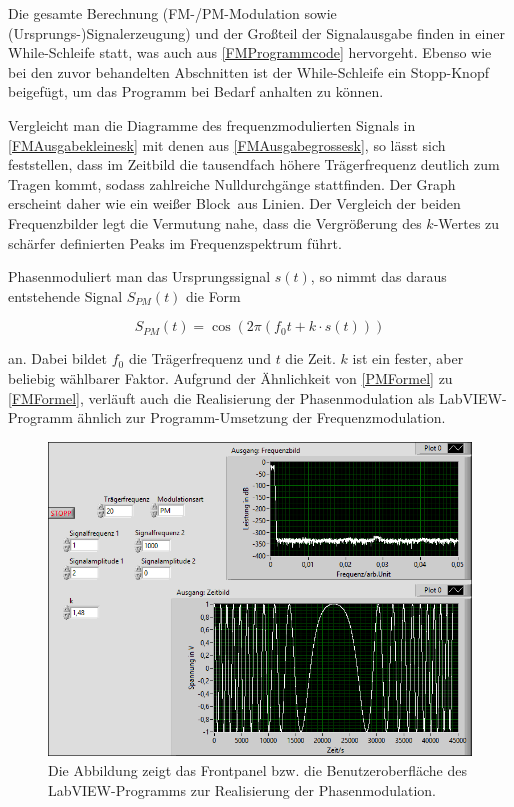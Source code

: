 \documentclass[
a4paper,
12pt,
pagesize,
ngerman
]{scrartcl}
\begin{document}
	\noindent Die gesamte Berechnung (FM-/PM-Modulation sowie (Ursprungs-)Signalerzeugung) und der Großteil der Signalausgabe finden in einer While-Schleife statt, was auch aus \cref{FMProgrammcode} hervorgeht. %
	Ebenso wie bei den zuvor behandelten Abschnitten ist der While-Schleife ein \glqq Stopp\grqq -Knopf beigefügt, um das Programm bei Bedarf anhalten zu können.

	Vergleicht man die Diagramme des frequenzmodulierten Signals in \cref{FMAusgabekleinesk} mit denen aus \cref{FMAusgabegrossesk}, so lässt sich feststellen, dass im Zeitbild die tausendfach höhere Trägerfrequenz deutlich zum Tragen kommt, sodass zahlreiche Nulldurchgänge stattfinden. 
	Der Graph erscheint daher wie ein \glqq weißer Block\grqq\ aus Linien. 
	Der Vergleich der beiden Frequenzbilder legt die Vermutung nahe, dass die Vergrößerung des $k$-Wertes zu schärfer definierten Peaks im Frequenzspektrum führt.%
	
	Phasenmoduliert man das Ursprungssignal $s(t)$, so nimmt das daraus entstehende Signal $S_{PM}(t)$ die Form
	
	\begin{equation} \label{PMFormel}
	S_{PM}(t) = \cos (2\pi (f_0 t + k \cdot s(t)))
	\end{equation}
	
	\noindent an. 
	Dabei bildet $f_0$ die Trägerfrequenz und $t$ die Zeit. 
	$k$ ist ein fester, aber beliebig wählbarer Faktor. 
	Aufgrund der Ähnlichkeit von \cref{PMFormel} zu \cref{FMFormel}, verläuft auch die Realisierung der Phasenmodulation als LabVIEW-Programm ähnlich zur Programm-Umsetzung der Frequenzmodulation. 
	
	\begin{figure}[H]
		\centering
		\includegraphics[width=1.0\textwidth]{EIRE2018Dateien/Tag4/FMPM-Erzeugung/PM-FMPM-Erzeugungp}
		\caption{Die Abbildung zeigt das Frontpanel bzw. die Benutzeroberfläche des LabVIEW-Programms zur Realisierung der Phasenmodulation.}
		\label{PMAusgabe}
	\end{figure}
\end{document}
